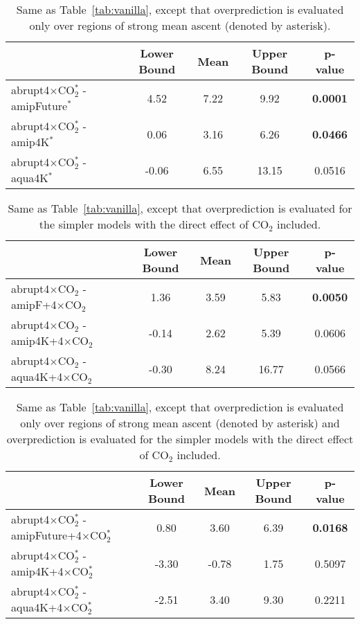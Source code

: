\documentclass{article}
\begin{document}
\begin{table}
\caption{Same as Table~\ref{tab:vanilla}, except that overprediction is evaluated only over regions of strong mean ascent (denoted by asterisk).}
\begin{tabular}{l c c c c} \hline
& Lower Bound & Mean & Upper Bound & p-value \\ \hline
abrupt4$\times$CO$_2^*$ - amipFuture$^*$ & 4.52 & 7.22 & 9.92 & \textbf{0.0001} \\
abrupt4$\times$CO$_2^*$ - amip4K$^*$ & 0.06 & 3.16 & 6.26 & \textbf{0.0466} \\
abrupt4$\times$CO$_2^*$ - aqua4K$^*$ & -0.06 & 6.55 & 13.15 & 0.0516 \\ \hline
\end{tabular}
\label{tab:ascent}
\end{table}

\begin{table}
\caption{Same as Table~\ref{tab:vanilla}, except that overprediction is evaluated for the simpler models with the direct effect of CO$_2$ included.}
\begin{tabular}{l c c c c} \hline
& Lower Bound & Mean & Upper Bound & p-value \\ \hline
abrupt4$\times$CO$_2$ - amipF+4$\times$CO$_2$ & 1.36 & 3.59 & 5.83 & \textbf{0.0050} \\
abrupt4$\times$CO$_2$ - amip4K+4$\times$CO$_2$ & -0.14 & 2.62 & 5.39 & 0.0606 \\
abrupt4$\times$CO$_2$ - aqua4K+4$\times$CO$_2$ & -0.30 & 8.24 & 16.77 & 0.0566 \\ \hline
\end{tabular}
\label{tab:co2}
\end{table}

\begin{table}
\caption{Same as Table~\ref{tab:vanilla}, except that overprediction is evaluated only over regions of strong mean ascent (denoted by asterisk) and overprediction is evaluated for the simpler models with the direct effect of CO$_2$ included.}
\begin{tabular}{l c c c c} \hline
& Lower Bound & Mean & Upper Bound & p-value \\ \hline
abrupt4$\times$CO$_2^*$ - amipFuture+4$\times$CO$_2^*$ & 0.80 & 3.60 & 6.39 & \textbf{0.0168} \\
abrupt4$\times$CO$_2^*$ - amip4K+4$\times$CO$_2^*$ & -3.30 & -0.78 & 1.75 & 0.5097 \\
abrupt4$\times$CO$_2^*$ - aqua4K+4$\times$CO$_2^*$ & -2.51 & 3.40 & 9.30 & 0.2211 \\ \hline
\end{tabular}
\label{tab:both}
\end{table}
\end{document}
